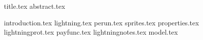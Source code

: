 \documentclass[11pt]{llncs}
\begin{document}
{title.tex}
\thispagestyle{plain}
{abstract.tex}

{introduction.tex}
{lightning.tex}
{perun.tex}
{sprites.tex}
{properties.tex}
{lightningprot.tex}
{payfunc.tex}
{lightningnotes.tex}
{model.tex}

\end{document}
